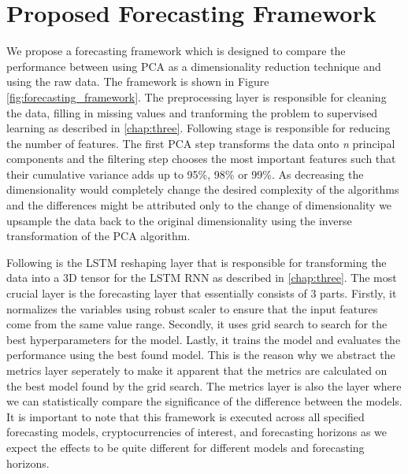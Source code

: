 \section{Proposed Forecasting Framework}

We propose a forecasting framework which is designed to compare the performance between using \ac{PCA} as a 
dimensionality reduction technique and using the raw data. 
The framework is shown in Figure \ref{fig:forecasting_framework}.
The preprocessing layer is responsible for cleaning the data, filling in missing values and tranforming 
the problem to supervised learning as described 
in \ref{chap:three}. Following stage is responsible for reducing the number of features. 
The first \ac{PCA} step transforms the data onto \textit{n} principal components and the filtering step
chooses the most important features such that their cumulative variance adds up to 95\%, 98\% or 99\%.
As decreasing the dimensionality would completely change the desired
complexity of the algorithms and the differences might be attributed only to the change 
of dimensionality we upsample the data back to the original dimensionality using 
the inverse transformation of the \ac{PCA} algorithm.

Following is the \ac{LSTM} reshaping layer that is responsible for transforming the data into a 3D tensor for 
the \ac{LSTM} \ac{RNN} as described 
in \ref{chap:three}. The most crucial layer is the forecasting layer that essentially consists of 3 parts.
Firstly, it normalizes the variables using robust scaler to ensure that the input features come from 
the same value range. Secondly, it uses grid search to search for the best
hyperparameters for the model. 
Lastly, it trains the model and evaluates the performance using the best found model. This is the reason
why we abstract the metrics layer seperately to make it apparent that the metrics are calculated
on the best model found by the grid search. The metrics layer is also the layer where
we can statistically compare the significance of the difference between the models.
It is important to note that this framework is executed across all specified forecasting models, 
cryptocurrencies of interest, and forecasting horizons as we expect the effects
to be quite different for different models and forecasting horizons. 


